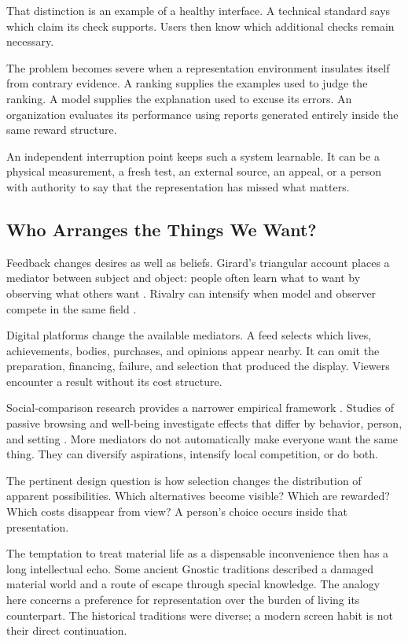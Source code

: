That distinction is an example of a healthy interface. A technical standard says which claim its check supports. Users then know which additional checks remain necessary.

The problem becomes severe when a representation environment insulates itself from contrary evidence. A ranking supplies the examples used to judge the ranking. A model supplies the explanation used to excuse its errors. An organization evaluates its performance using reports generated entirely inside the same reward structure.

An independent interruption point keeps such a system learnable. It can be a physical measurement, a fresh test, an external source, an appeal, or a person with authority to say that the representation has missed what matters.

\subsection{Who Arranges the Things We Want?}

Feedback changes desires as well as beliefs. Girard's triangular account places a mediator between subject and object: people often learn what to want by observing what others want \cite{girard1961mensonge}. Rivalry can intensify when model and observer compete in the same field \cite{girard1972violence}.

Digital platforms change the available mediators. A feed selects which lives, achievements, bodies, purchases, and opinions appear nearby. It can omit the preparation, financing, failure, and selection that produced the display. Viewers encounter a result without its cost structure.

Social-comparison research provides a narrower empirical framework \cite{festinger1954theory}. Studies of passive browsing and well-being investigate effects that differ by behavior, person, and setting \cite{verduyn2015passive}. More mediators do not automatically make everyone want the same thing. They can diversify aspirations, intensify local competition, or do both.

The pertinent design question is how selection changes the distribution of apparent possibilities. Which alternatives become visible? Which are rewarded? Which costs disappear from view? A person's choice occurs inside that presentation.

The temptation to treat material life as a dispensable inconvenience then has a long intellectual echo. Some ancient Gnostic traditions described a damaged material world and a route of escape through special knowledge. The analogy here concerns a preference for representation over the burden of living its counterpart. The historical traditions were diverse; a modern screen habit is not their direct continuation.

